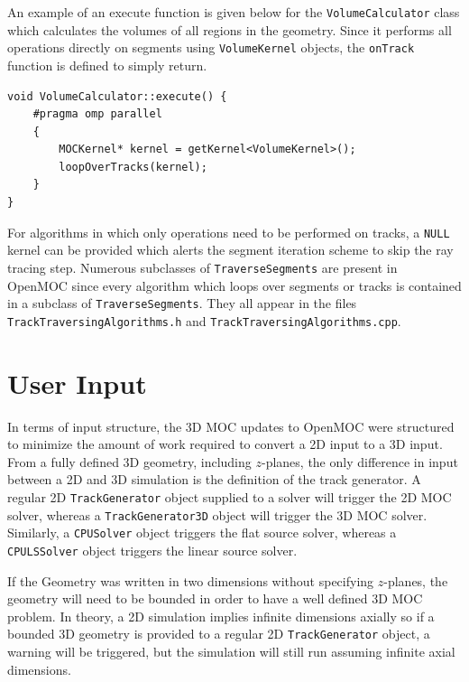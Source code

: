 An example of an execute function is given below for the \texttt{VolumeCalculator} class which calculates the volumes of all regions in the geometry. Since it performs all operations directly on segments using \texttt{VolumeKernel} objects, the \texttt{onTrack} function is defined to simply return.

\begin{center}
\begin{lstlisting}
void VolumeCalculator::execute() {
	#pragma omp parallel
	{
		MOCKernel* kernel = getKernel<VolumeKernel>();
		loopOverTracks(kernel);
	}
}
\end{lstlisting}
\end{center}

For algorithms in which only operations need to be performed on tracks, a \texttt{NULL} kernel can be provided which alerts the segment iteration scheme to skip the ray tracing step. Numerous subclasses of \texttt{TraverseSegments} are present in OpenMOC since every algorithm which loops over segments or tracks is contained in a subclass of \texttt{TraverseSegments}. They all appear in the files \texttt{TrackTraversingAlgorithms.h} and \texttt{TrackTraversingAlgorithms.cpp}.

\section{User Input}
\label{sec:user-input}

In terms of input structure, the 3D MOC updates to OpenMOC were structured to minimize the amount of work required to convert a 2D input to a 3D input. From a fully defined 3D geometry, including $z$-planes, the only difference in input between a 2D and 3D simulation is the definition of the track generator. A regular 2D \texttt{TrackGenerator} object supplied to a solver will trigger the 2D MOC solver, whereas a \texttt{TrackGenerator3D} object will trigger the 3D MOC solver. Similarly, a \texttt{CPUSolver} object triggers the flat source solver, whereas a \texttt{CPULSSolver} object triggers the linear source solver.

If the Geometry was written in two dimensions without specifying $z$-planes, the geometry will need to be bounded in order to have a well defined 3D MOC problem. In theory, a 2D simulation implies infinite dimensions axially so if a bounded 3D geometry is provided to a regular 2D \texttt{TrackGenerator} object, a warning will be triggered, but the simulation will still run assuming infinite axial dimensions.

